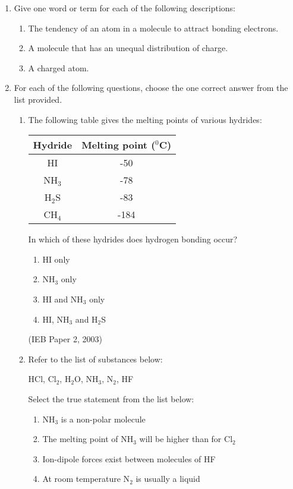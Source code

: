 \begin{eocexercises}{}
\begin{enumerate}
\item{Give one word or term for each of the following descriptions:}
	\begin{enumerate}
	\item{The tendency of an atom in a molecule to attract bonding electrons.}
	\item{A molecule that has an unequal distribution of charge.}
	\item{A charged atom.}
	\end{enumerate}

\item{For each of the following questions, choose the one correct answer from the list provided.}
	\begin{enumerate}
	\item{The following table gives the melting points of various hydrides:}
\begin{center}
\begin{tabular}{|c|c|}\hline
\textbf{Hydride} & \textbf{Melting point} ($^{0}$C) \\\hline
HI & -50 \\\hline
NH$_{3}$ & -78 \\\hline
H$_{2}$S & -83 \\\hline
CH$_{4}$ & -184 \\\hline
\end{tabular}
\end{center}

In which of these hydrides does hydrogen bonding occur?
		\begin{enumerate}
		\item{HI only}
		\item{NH$_{3}$ only}
		\item{HI and NH$_{3}$ only}
		\item{HI, NH$_{3}$ and H$_{2}$S}
		\end{enumerate}
(IEB Paper 2, 2003)

	\item{Refer to the list of substances below:}
	\begin{center}
	HCl, Cl$_{2}$, H$_{2}$O, NH$_{3}$, N$_{2}$, HF
	\end{center}
	Select the true statement from the list below:
		\begin{enumerate}
		\item{NH$_{3}$ is a non-polar molecule}
		\item{The melting point of NH$_{3}$ will be higher than for Cl$_{2}$}
		\item{Ion-dipole forces exist between molecules of HF}
		\item{At room temperature N$_{2}$ is usually a liquid}
		\end{enumerate}
	\end{enumerate}


\end{enumerate}
\end{eocexercises}
